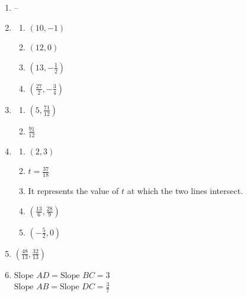 \documentclass{article}
\begin{document}
\begin{enumerate}
\begin{enumerate}
	\item $\left[ -\frac{4c\sqrt{65}}{65}, \frac{7c\sqrt{65}}{65} \right]$

	\end{enumerate}
	
\item --

\item \begin{enumerate}

	\item $(10, -1)$
	
	\item $(12, 0)$
	
	\item $(13, -\frac{1}{2})$
	
	\item $(\frac{27}{2}, -\frac{3}{4})$
	
	\end{enumerate}
	
\item \begin{enumerate}

	\item $(5, \frac{71}{12})$
	
	\item $\frac{91}{12}$

	\end{enumerate}
	
\item \begin{enumerate}

	\item $(2, 3)$
	
	\item $t = \frac{37}{18}$
	
	\item It represents the value of $t$ at which the two lines intersect.
	
	\item $(\frac{13}{6}, \frac{28}{9})$
	
	\item $(-\frac{5}{2}, 0)$

	\end{enumerate}
	
\item $(\frac{48}{13}, \frac{32}{13})$

\item $\text{Slope } AD = \text{Slope } BC = 3$ \\
	$\text{Slope } AB = \text{Slope } DC = \frac{3}{7}$
	

\end{enumerate}
\end{document}
